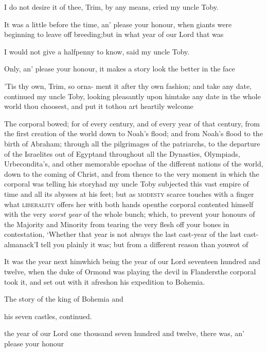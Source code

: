 \documentclass{article}
\begin{document}
I do not desire it of thee, Trim, by any means, cried my
uncle Toby.

\tsh It was a little before the time, an’ please
your honour, when giants were beginning to leave off
breeding;\tsk\break but in what year of our Lord that\break
was\tsh{}

\tsh I would not give a halfpenny to know, said my uncle
Toby.

\tsh Only, an’ please your honour, it makes a
story look the better in the face\tsh

\tsh ’Tis thy own, Trim, so orna-\break
ment it after thy own fashion; and take\break
any date, continued my uncle Toby,\break
looking pleasantly upon him\tsk take any date in the
whole world thou choosest, and put it to\tsk thou art heartily
welcome\tsh

The corporal bowed; for of every\break
century, and of every year of
that century, from the first creation of the world down to
Noah’s flood; and from Noah’s flood to
the birth of Abraham; through all the pilgrimages of the
patriarchs, to the departure of the Israelites out of
Egypt\tsh and throughout all the Dynasties,
Olympiads, Urbecondita’s, and other memorable epochas of the
different nations of the world, down to the coming of Christ, and
from thence to the very moment in which the corporal was telling
his story\tsh had my uncle Toby subjected this vast
empire of time and all its abysses at his feet; but as \textsc{modesty} scarce touches with a
finger what \textsc{liberality} offers her with both hands
open\tsk the corporal contented himself with the very \textit{worst
year} of the whole bunch; which, to prevent your honours of the
Majority and Minority from tearing the very flesh off your bones in
contestation, ‘Whether that year is not always the last
cast-year of the last cast-almanack’\tsh I tell you
plainly it was; but from a different reason than you\break wot of\tsh

\tsk It was the year next him\tsk\break which being
the year of our Lord\break 
seventeen hundred and twelve, when\break
the duke of Ormond was playing the devil in
Flanders\tsh the corporal took it, and set out with
it afresh\break on his expedition to Bohemia.

\vfill {} \eject\null\smallskip
\centerline{The story of the king of Bohemia and}
\centerline{his seven castles, continued.}

 the year of our Lord one thousand seven hundred and twelve, there
was, an’ please your honour\tsh
\end{document}
